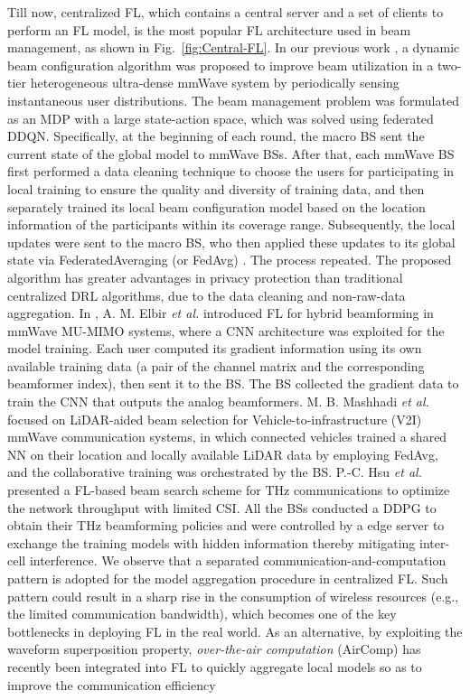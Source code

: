 \documentclass[journal,comsoc]{IEEEtran}
\begin{document}
Till now, centralized FL, which contains a central server and a set of clients to perform an FL model, is the most popular FL architecture used in beam management, as shown in Fig.~\ref{fig:Central-FL}. In our previous work \cite{Beam-Management-Ultra-Dense-mmWave-Network-2023}, a dynamic beam configuration algorithm was proposed to improve beam utilization in a two-tier heterogeneous ultra-dense mmWave system by periodically sensing instantaneous user distributions. The beam management problem was formulated as an MDP with a large state-action space, which was solved using federated DDQN. Specifically, at the beginning of each round, the macro BS sent the current state of the global model to mmWave BSs. After that, each mmWave BS first performed a data cleaning technique to choose the users for participating in local training to ensure the quality and diversity of training data, and then separately trained its local beam configuration model based on the location information of the participants within its coverage range. Subsequently, the local updates were sent to the macro BS, who then applied these updates to its global state via FederatedAveraging (or FedAvg) \cite{Communication-Efficient-Learning-2023}. The process repeated. The proposed algorithm has greater advantages in privacy protection than traditional centralized DRL algorithms, due to the data cleaning and non-raw-data aggregation. In \cite{Federated-Learning-Hybrid-Beamforming-2020}, A. M. Elbir \emph{et al.}  introduced FL for hybrid beamforming in mmWave MU-MIMO systems, where a CNN architecture was exploited for the  model training. Each user computed its gradient information using its own available training data (a pair of the channel matrix and the corresponding beamformer index), then sent it to the BS. The BS collected the gradient data to train the CNN that outputs the analog beamformers. M. B. Mashhadi \emph{et al.} \cite{Federated-mmWave-Beam-Selection-LIDAR-2021} focused on LiDAR-aided beam selection for Vehicle-to-infrastructure (V2I) mmWave communication systems, in which connected vehicles trained a shared NN on their location and locally available LiDAR data by employing FedAvg, and the collaborative training was orchestrated by the BS. P.-C. Hsu \emph{et al.} \cite{Federated-Deep-Reinforcement-Learning-THz-Beam-Search-2022} presented a FL-based beam search scheme for THz communications to optimize the network throughput with limited CSI. All the BSs conducted a DDPG to obtain their THz beamforming policies and were controlled by a edge server to exchange the training models with hidden information thereby mitigating inter-cell interference. We observe that a separated communication-and-computation pattern is adopted for the model aggregation procedure in centralized FL. Such pattern could result in a sharp rise in the consumption of wireless resources (e.g., the limited communication bandwidth), which becomes one of the key bottlenecks in deploying FL in the real world. As an alternative, by exploiting the waveform superposition property, \emph{over-the-air computation} (AirComp) has recently been integrated into FL to quickly aggregate local models so as to improve the communication efficiency 
\end{document}
